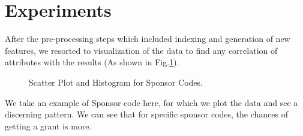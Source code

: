\documentclass{article} %
\begin{document}
	
\section{Experiments}

After the pre-processing steps which included indexing and generation of new features, we resorted to visualization of the data to find any correlation of attributes with the results (As shown in Fig.\ref{fig:sponsor}).

\begin{figure}[h]
	\begin{center}
	\end{center}
	\caption{Scatter Plot and Histogram for Sponsor Codes.}
	\label{fig:sponsor}
\end{figure}

We take an example of Sponsor code here, for which we plot the data and see a discerning pattern. We can see that for specific sponsor codes, the chances of getting a grant is more.
\end{document}
